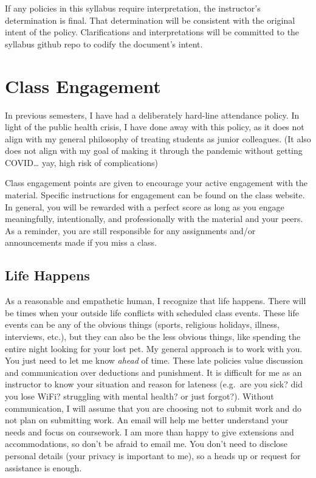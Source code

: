 If any policies in this syllabus require interpretation, the instructor's determination is final. That determination will be consistent with the original intent of the policy. Clarifications and interpretations will be committed to the syllabus github repo to codify the document's intent.

\hypertarget{class-engagement}{%
\chapter{Class Engagement}\label{class-engagement}}

In previous semesters, I have had a deliberately hard-line attendance policy.
In light of the public health crisis, I have done away with this policy, as it does not align with my general philosophy of treating students as junior colleagues. (It also does not align with my goal of making it through the pandemic without getting COVID\ldots{} yay, high risk of complications)

Class engagement points are given to encourage your active engagement with the material.
Specific instructions for engagement can be found on the class website. In general, you will be rewarded with a perfect score as long as you engage meaningfully, intentionally, and professionally with the material and your peers. As a reminder, you are still responsible for any assignments and/or announcements made if you miss a class.

\hypertarget{life-happens}{%
\section{Life Happens}\label{life-happens}}

As a reasonable and empathetic human, I recognize that life happens. There will be times when your outside life conflicts with scheduled class events. These life events can be any of the obvious things (sports, religious holidays, illness, interviews, etc.), but they can also be the less obvious things, like spending the entire night looking for your lost pet. My general approach is to work with you. You just need to let me know \emph{ahead} of time. These late policies value discussion and communication over deductions and punishment.
It is difficult for me as an instructor to know your situation and reason for lateness (e.g.~are you sick? did you lose WiFi? struggling with mental health? or just forgot?). Without communication, I will assume that you are choosing not to submit work and do not plan on submitting work. An email will help me better understand your needs and focus on coursework. I am more than happy to give extensions and accommodations, so don't be afraid to email me. You don't need to disclose personal details (your privacy is important to me), so a heads up or request for assistance is enough.

